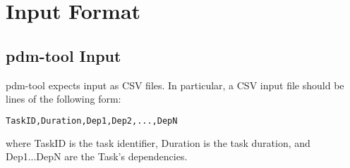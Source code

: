 \chapter{Input Format}

\section{pdm-tool Input}

pdm-tool expects input as CSV files. In particular, a CSV input file
should be lines of the following form:

\begin{lstlisting}[language=python,frame=single,showstringspaces=false]
TaskID,Duration,Dep1,Dep2,...,DepN
\end{lstlisting}

where TaskID is the task identifier, Duration is the task duration, and
Dep1...DepN are the Task's dependencies.
